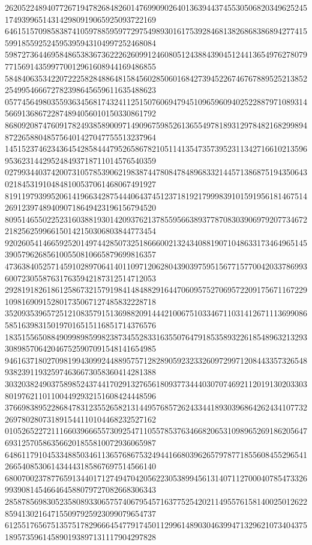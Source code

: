 \begin{DoxyCode}
      262052248940772671947826848260147699090264013639443745530506820349625245174939965143142980919065925093722169
      646151570985838741059788595977297549893016175392846813826868386894277415599185592524595395943104997252468084
      598727364469584865383673622262609912460805124388439045124413654976278079771569143599770012961608944169486855
      584840635342207222582848864815845602850601684273945226746767889525213852254995466672782398645659611635488623
      057745649803559363456817432411251507606947945109659609402522887971089314566913686722874894056010150330861792
      868092087476091782493858900971490967598526136554978189312978482168299894872265880485756401427047755513237964
      145152374623436454285844479526586782105114135473573952311342716610213596953623144295248493718711014576540359
      027993440374200731057853906219838744780847848968332144571386875194350643021845319104848100537061468067491927
      819119793995206141966342875444064374512371819217999839101591956181467514269123974894090718649423196156794520
      809514655022523160388193014209376213785595663893778708303906979207734672218256259966150142150306803844773454
      920260541466592520149744285073251866600213243408819071048633173464965145390579626856100550810665879699816357
      473638405257145910289706414011097120628043903975951567715770042033786993600723055876317635942187312514712053
      292819182618612586732157919841484882916447060957527069572209175671167229109816909152801735067127485832228718
      352093539657251210835791513698820914442100675103346711031412671113699086585163983150197016515116851714376576
      183515565088490998985998238734552833163550764791853589322618548963213293308985706420467525907091548141654985
      946163718027098199430992448895757128289059232332609729971208443357326548938239119325974636673058360414281388
      303203824903758985243744170291327656180937734440307074692112019130203303801976211011004492932151608424448596
      376698389522868478312355265821314495768572624334418930396864262434107732269780280731891544110104468232527162
      010526522721116603966655730925471105578537634668206531098965269186205647693125705863566201855810072936065987
      648611791045334885034611365768675324944166803962657978771855608455296541266540853061434443185867697514566140
      680070023787765913440171274947042056223053899456131407112700040785473326993908145466464588079727082668306343
      285878569830523580893306575740679545716377525420211495576158140025012622859413021647155097925923099079654737
      612551765675135751782966645477917450112996148903046399471329621073404375189573596145890193897131117904297828

\end{DoxyCode}
